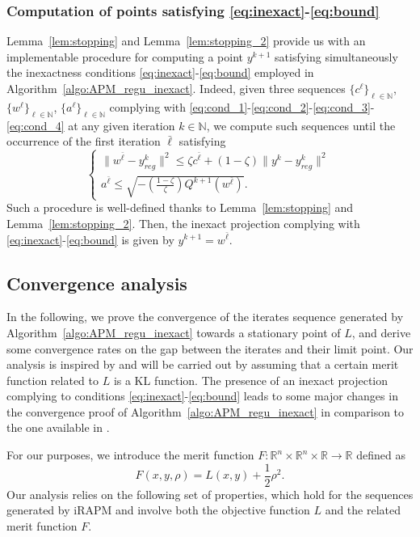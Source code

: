 \documentclass[pdflatex,sn-mathphys-num]{sn-jnl}
\numberwithin{equation}{section}%
\def\R{\mathbb{R}}
\def\N{\mathbb{N}}
\newcommand{\yck}{{y_{reg}^k}}
\theoremstyle{thmstyleone}%
\theoremstyle{thmstyletwo}%
\theoremstyle{thmstylethree}%
\begin{document}
\subsubsection{Computation of points satisfying \eqref{eq:inexact}-\eqref{eq:bound}}
Lemma~\ref{lem:stopping} and Lemma~\ref{lem:stopping_2} provide us with an implementable procedure for computing a point $y^{k+1}$ satisfying simultaneously the inexactness conditions \eqref{eq:inexact}-\eqref{eq:bound} employed in Algorithm~\ref{algo:APM_regu_inexact}. Indeed, given three sequences $\{c^{\ell}\}_{\ell\in\N}$, $\{w^{\ell}\}_{\ell\in\N}$, $\{a^{\ell}\}_{\ell\in\N}$ complying with \eqref{eq:cond_1}-\eqref{eq:cond_2}-\eqref{eq:cond_3}-\eqref{eq:cond_4} at any given iteration $k\in\N$, we compute such sequences until the occurrence of the first iteration $\bar{\ell}$ satisfying
\begin{equation}\label{eq:stopping_final}
    \begin{cases}
        \|w^{\bar{\ell}}-{\yck}\|^2\leq \zeta c^{\bar{\ell}}+(1-\zeta)\|y^k-{\yck}\|^2\\
        a^{\bar{\ell}}\leq \sqrt{-\left(\frac{1-\zeta}{\zeta}\right)Q^{k+1}(w^{\bar{\ell}})}.
    \end{cases}
\end{equation}
Such a procedure is well-defined thanks to Lemma~\ref{lem:stopping} and Lemma~\ref{lem:stopping_2}. Then, the inexact projection complying with \eqref{eq:inexact}-\eqref{eq:bound} is given by $y^{k+1}=w^{\bar{\ell}}$.

\subsection{Convergence analysis}
In the following, we prove the convergence of the iterates sequence generated by Algorithm~\ref{algo:APM_regu_inexact} towards a stationary point of $L$, and derive some convergence rates on the gap between the iterates and their limit point. Our analysis is inspired by \cite{attouch2010proximal} and will be carried out by assuming that a certain merit function related to $L$ is a KL function. The presence of an inexact projection complying to conditions \eqref{eq:inexact}-\eqref{eq:bound} leads to some major changes in the convergence proof of Algorithm~\ref{algo:APM_regu_inexact} in comparison to the one available in \cite{attouch2010proximal}.

For our purposes, we introduce the merit function $F:\R^n\times \R^n\times \R\rightarrow \R$ defined as
\begin{equation}\label{eq:merit}
    F(x,y,\rho) = L(x,y) +\frac{1}{2}\rho^2.
\end{equation}
Our analysis relies on the following set of properties, which hold for the sequences generated by iRAPM and involve both the objective function $L$ and the related merit function $F$.
\end{document}
